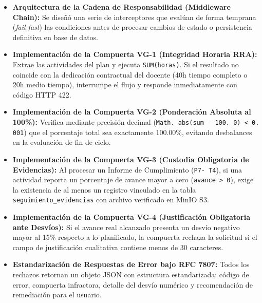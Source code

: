 \documentclass[12pt,a4paper]{article}
\begin{document}
\begin{itemize}[leftmargin=1.5em, itemsep=4pt]
    \item \textbf{Arquitectura de la Cadena de Responsabilidad (Middleware Chain):} Se diseñó una serie de interceptores que evalúan de forma temprana (\textit{fail-fast}) las condiciones antes de procesar cambios de estado o persistencia definitiva en base de datos.
    \item \textbf{Implementación de la Compuerta VG-1 (Integridad Horaria RRA):} Extrae las actividades del plan y ejecuta \texttt{SUM(horas)}. Si el resultado no coincide con la dedicación contractual del docente (40h tiempo completo o 20h medio tiempo), interrumpe el flujo y responde inmediatamente con código HTTP 422.
    \item \textbf{Implementación de la Compuerta VG-2 (Ponderación Absoluta al 100\%):} Verifica mediante precisión decimal (\texttt{Math. abs(sum - 100. 0) < 0. 001}) que el porcentaje total sea exactamente 100.00\%, evitando desbalances en la evaluación de fin de ciclo.
    \item \textbf{Implementación de la Compuerta VG-3 (Custodia Obligatoria de Evidencias):} Al procesar un Informe de Cumplimiento (\texttt{P7- T4}), si una actividad reporta un porcentaje de avance mayor a cero (\texttt{avance > 0}), exige la existencia de al menos un registro vinculado en la tabla \texttt{seguimiento\_\allowbreak   evidencias} con archivo verificado en MinIO S3.
    \item \textbf{Implementación de la Compuerta VG-4 (Justificación Obligatoria ante Desvíos):} Si el avance real alcanzado presenta un desvío negativo mayor al 15\% respecto a lo planificado, la compuerta rechaza la solicitud si el campo de justificación cualitativa contiene menos de 30 caracteres.
    \item \textbf{Estandarización de Respuestas de Error bajo RFC 7807:} Todos los rechazos retornan un objeto JSON con estructura estandarizada: código de error, compuerta infractora, detalle del desvío numérico y recomendación de remediación para el usuario.
\end{itemize}
\end{document}
